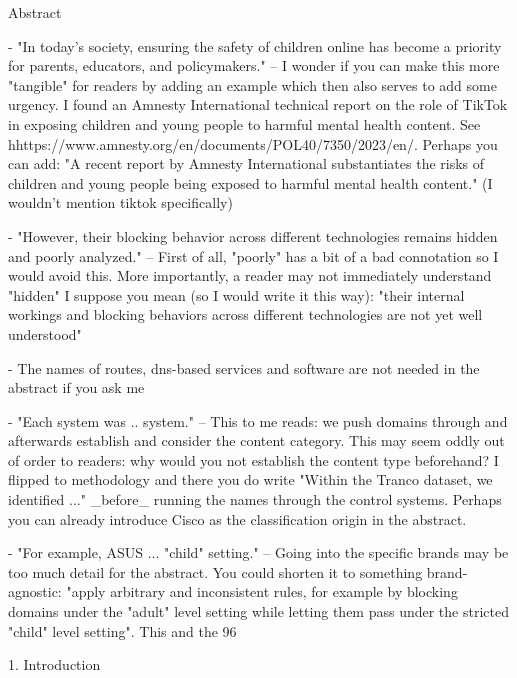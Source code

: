 
Abstract

- "In today’s society, ensuring the safety of children online has become a priority for parents, educators, and policymakers." -- I wonder if you can make this more "tangible" for readers by adding an example which then also serves to add some urgency. I found an Amnesty International technical report on the role of TikTok in exposing children and young people to harmful mental health content. See hhttps://www.amnesty.org/en/documents/POL40/7350/2023/en/. Perhaps you can add: "A recent report by Amnesty International substantiates the risks of children and young people being exposed to harmful mental health content." (I wouldn't mention tiktok specifically)

- "However, their blocking behavior across different technologies remains hidden and poorly analyzed." -- First of all, "poorly" has a bit of a bad connotation so I would avoid this. More importantly, a reader may not immediately understand "hidden" I suppose you mean (so I would write it this way): "their internal workings and blocking behaviors across different technologies are not yet well understood"

- The names of routes, dns-based services and software are not needed in the abstract if you ask me

- "Each system was .. system." -- This to me reads: we push domains through and afterwards establish and consider the content category. This may seem oddly out of order to readers: why would you not establish the content type beforehand? I flipped to methodology and there you do write "Within the Tranco dataset, we identified ..." _before_ running the names through the control systems. Perhaps you can already introduce Cisco as the classification origin in the abstract.

- "For example, ASUS ... "child" setting." -- Going into the specific brands may be too much detail for the abstract. You could shorten it to something brand-agnostic: "apply arbitrary and inconsistent rules, for example by blocking domains under the "adult" level setting while letting them pass under the stricted "child" level setting". This and the 96%


1. Introduction


